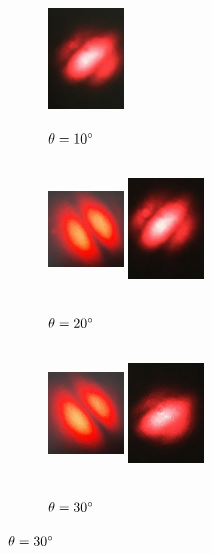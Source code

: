 \documentclass[12pt]{book}
\begin{document}
\begin{figure}[H]
\begin{subfigure}[b]{0.3\linewidth}
\includegraphics[width=2cm,height=3.5cm]{images/fotos/92.jpg}
\caption{$\theta=10\degree$}
\end{subfigure}
\begin{subfigure}[b]{0.3\linewidth}
\centering
\includegraphics[width=2cm,height=3.5cm]{images/fotos/41.jpg}
\includegraphics[width=2cm,height=3.5cm]{images/fotos/82.jpg}
\caption{$\theta=20\degree$}
\end{subfigure}
\begin{subfigure}[b]{0.3\linewidth}
\centering
\includegraphics[width=2cm,height=3.5cm]{images/fotos/51.jpg}
\includegraphics[width=2cm,height=3.5cm]{images/fotos/72.jpg}
\caption{$\theta=30\degree$}
\end{subfigure}

\end{figure}
\end{document}
